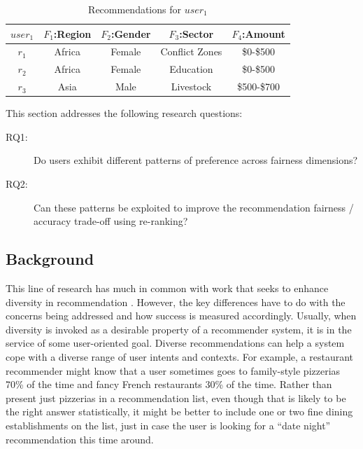 \begin{table}[tbh]\centering
    \begin{tabular}{|c|c|c|c|c|}
    \hline
        $user_{1}$ & $F_{1}$:Region & $F_{2}$:Gender & $F_{3}$:Sector & $F_{4}$:Amount \\
    \hline
        $r_{1}$ & Africa & Female & Conflict Zones & \$0-\$500\\
    \hline
        $r_{2}$ & Africa & Female & Education & \$0-\$500\\
    \hline \rowcolor[gray]{0.7}
        $r_{3}$ & Asia & Male & Livestock & \$500-\$700\\
    \hline
    \end{tabular}
    \caption{Recommendations for $user_{1}$}
    \label{table_user_recoms}
\end{table}


This section addresses the following research questions:
\begin{description}
    \item [RQ1:] Do users exhibit different patterns of preference across fairness dimensions?
    \item [RQ2:] Can these patterns be exploited to improve the recommendation fairness / accuracy trade-off using re-ranking?
\end{description}

\subsection{Background}
\label{subsec:ofair_backgroundd}

This line of research has much in common with work that seeks to enhance diversity in recommendation \cite{zhang2008MonotonyDiv, vargas2011rankRelDiv, carbonell1998use, eskandanian2017clustering}. However, the key differences have to do with the concerns being addressed and how success is measured accordingly. Usually, when diversity is invoked as a desirable property of a recommender system, it is in the service of some user-oriented goal. Diverse recommendations can help a system cope with a diverse range of user intents and contexts. For example, a restaurant recommender might know that a user sometimes goes to family-style pizzerias 70\% of the time and fancy French restaurants 30\% of the time. Rather than present just pizzerias in a recommendation list, even though that is likely to be the right answer statistically, it might be better to include one or two fine dining establishments on the list, just in case the user is looking for a ``date night'' recommendation this time around. 

